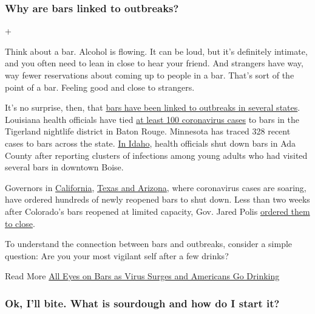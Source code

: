 \hypertarget{why-are-bars-linked-to-outbreaks}{%
\subsubsection{Why are bars linked to
outbreaks?}\label{why-are-bars-linked-to-outbreaks}}

+

Think about a bar. Alcohol is flowing. It can be loud, but it's
definitely intimate, and you often need to lean in close to hear your
friend. And strangers have way, way fewer reservations about coming up
to people in a bar. That's sort of the point of a bar. Feeling good and
close to strangers.

It's no surprise, then, that
\href{https://www.nytimes3xbfgragh.onion/2020/06/25/well/live/coronavirus-spread-bars-transmission.html}{bars
have been linked to outbreaks in several states}. Louisiana health
officials have tied
\href{https://www.nytimes3xbfgragh.onion/2020/06/22/us/new-coronavirus-phase.html}{at
least 100 coronavirus cases} to bars in the Tigerland nightlife district
in Baton Rouge. Minnesota has traced 328 recent cases to bars across the
state.
\href{https://www.boisestatepublicradio.org/post/bars-large-venues-close-ada-county-after-surge-coronavirus-prompts-rollback\#stream/0}{In
Idaho}, health officials shut down bars in Ada County after reporting
clusters of infections among young adults who had visited several bars
in downtown Boise.

Governors in
\href{https://www.nytimes3xbfgragh.onion/2020/07/01/us/california-coronavirus-reopening.html}{California},
\href{https://www.nytimes3xbfgragh.onion/2020/06/14/us/coronavirus-united-states.html}{Texas
and Arizona}, where coronavirus cases are soaring, have ordered hundreds
of newly reopened bars to shut down. Less than two weeks after
Colorado's bars reopened at limited capacity, Gov. Jared Polis
\href{https://www.denverpost.com/2020/06/30/colorado-bars-closed-coronavirus/}{ordered
them to close}.

To understand the connection between bars and outbreaks, consider a
simple question: Are you your most vigilant self after a few drinks?

 Read More
\href{https://www.nytimes3xbfgragh.onion/2020/07/02/us/coronavirus-bars.html}{All
Eyes on Bars as Virus Surges and Americans Go Drinking}

\hypertarget{ok-ill-bite-what-is-sourdough-and-how-do-i-start-it}{%
\subsubsection{Ok, I'll bite. What is sourdough and how do I start
it?}\label{ok-ill-bite-what-is-sourdough-and-how-do-i-start-it}}

